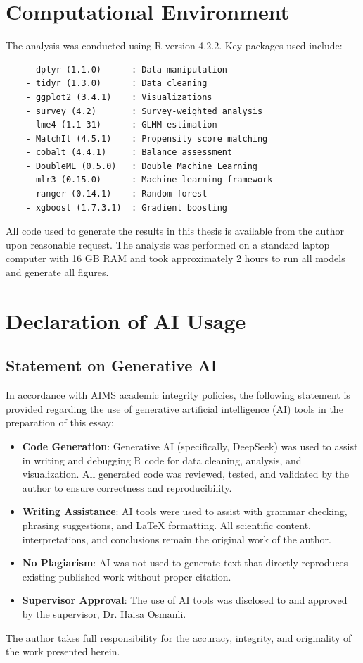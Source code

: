 \section{Computational Environment}

The analysis was conducted using R version 4.2.2. Key packages used include:

\begin{verbatim}
	- dplyr (1.1.0)      : Data manipulation
	- tidyr (1.3.0)      : Data cleaning
	- ggplot2 (3.4.1)    : Visualizations
	- survey (4.2)       : Survey-weighted analysis
	- lme4 (1.1-31)      : GLMM estimation
	- MatchIt (4.5.1)    : Propensity score matching
	- cobalt (4.4.1)     : Balance assessment
	- DoubleML (0.5.0)   : Double Machine Learning
	- mlr3 (0.15.0)      : Machine learning framework
	- ranger (0.14.1)    : Random forest
	- xgboost (1.7.3.1)  : Gradient boosting
\end{verbatim}

All code used to generate the results in this thesis is available from the author upon reasonable request. The analysis was performed on a standard laptop computer with 16 GB RAM and took approximately 2 hours to run all models and generate all figures.

\section{Declaration of AI Usage}

\subsection{Statement on Generative AI}

In accordance with AIMS academic integrity policies, the following statement is provided regarding the use of generative artificial intelligence (AI) tools in the preparation of this essay:

\begin{itemize}
	\item \textbf{Code Generation}: Generative AI (specifically, DeepSeek) was used to assist in writing and debugging R code for data cleaning, analysis, and visualization. All generated code was reviewed, tested, and validated by the author to ensure correctness and reproducibility.
	
	\item \textbf{Writing Assistance}: AI tools were used to assist with grammar checking, phrasing suggestions, and LaTeX formatting. All scientific content, interpretations, and conclusions remain the original work of the author.
	
	\item \textbf{No Plagiarism}: AI was not used to generate text that directly reproduces existing published work without proper citation.
	
	\item \textbf{Supervisor Approval}: The use of AI tools was disclosed to and approved by the supervisor, Dr. Haisa Osmanli.
\end{itemize}

The author takes full responsibility for the accuracy, integrity, and originality of the work presented herein.
